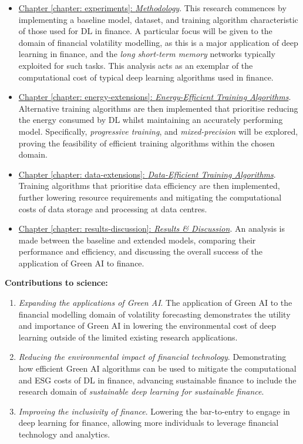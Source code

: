 \documentclass[a4paper, 11pt]{report}
\begin{document}
    \begin{itemize}
        \item \underline{Chapter \ref{chapter: experiments}: \emph{Methodology}}. This research commences by implementing a baseline model, dataset, and training algorithm characteristic of those used for DL in finance. A particular focus will be given to the domain of financial volatility modelling, as this is a major application of deep learning in finance, and the \emph{long short-term memory} networks typically exploited for such tasks. This analysis acts as an exemplar of the computational cost of typical deep learning algorithms used in finance.

        \item \underline{Chapter \ref{chapter: energy-extensions}: \emph{Energy-Efficient Training Algorithms}}. Alternative training algorithms are then implemented that prioritise reducing the energy consumed by DL whilst maintaining an accurately performing model. Specifically, \emph{progressive training}, and \emph{mixed-precision} will be explored, proving the feasibility of efficient training algorithms within the chosen domain.
        
        \item \underline{Chapter \ref{chapter: data-extensions}: \emph{Data-Efficient Training Algorithms}}. Training algorithms that prioritise data efficiency are then implemented, further lowering resource requirements and mitigating the computational costs of data storage and processing at data centres.
        
        \item \underline{Chapter \ref{chapter: results-discussion}: \emph{Results \& Discussion}}. An analysis is made between the baseline and extended models, comparing their performance and efficiency, and discussing the overall success of the application of Green AI to finance.
    \end{itemize}

    \textbf{Contributions to science:} 
    \begin{enumerate}
        \item \emph{Expanding the applications of Green AI}. The application of Green AI to the financial modelling domain of volatility forecasting demonstrates the utility and importance of Green AI in lowering the environmental cost of deep learning outside of the limited existing research applications. 

        \item \emph{Reducing the environmental impact of financial technology}. Demonstrating how efficient Green AI algorithms can be used to mitigate the computational and ESG costs of DL in finance, advancing sustainable finance to include the research domain of \emph{sustainable deep learning for sustainable finance}.

        \item \emph{Improving the inclusivity of finance}. Lowering the bar-to-entry to engage in deep learning for finance,  allowing more individuals to leverage financial technology and analytics.
    \end{enumerate}
\end{document}
